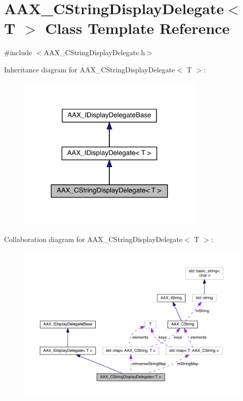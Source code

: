 \hypertarget{a00044}{}\section{A\+A\+X\+\_\+\+C\+String\+Display\+Delegate$<$ T $>$ Class Template Reference}
\label{a00044}


{\ttfamily \#include $<$A\+A\+X\+\_\+\+C\+String\+Display\+Delegate.\+h$>$}



Inheritance diagram for A\+A\+X\+\_\+\+C\+String\+Display\+Delegate$<$ T $>$\+:
\nopagebreak
\begin{figure}[H]
\begin{center}
\leavevmode
\includegraphics[width=252pt]{a00477}
\end{center}
\end{figure}


Collaboration diagram for A\+A\+X\+\_\+\+C\+String\+Display\+Delegate$<$ T $>$\+:
\nopagebreak
\begin{figure}[H]
\begin{center}
\leavevmode
\includegraphics[width=350pt]{a00478}
\end{center}
\end{figure}



